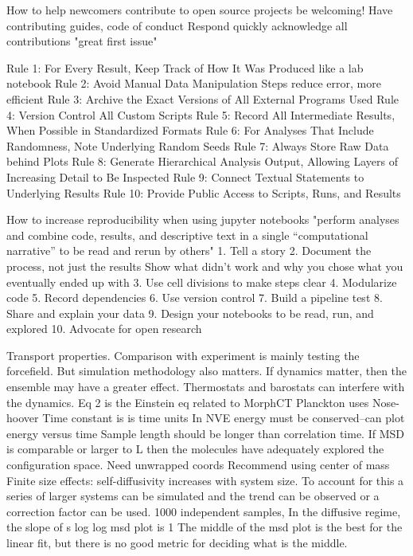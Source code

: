 \cite{Sholler2019}
How to help newcomers contribute to open source projects
be welcoming!
Have contributing guides, code of conduct
Respond quickly
acknowledge all contributions
"great first issue"

\cite{Sandve2013}
Rule 1: For Every Result, Keep Track of How It Was Produced
like a lab notebook
Rule 2: Avoid Manual Data Manipulation Steps
reduce error, more efficient
Rule 3: Archive the Exact Versions of All External Programs Used
Rule 4: Version Control All Custom Scripts
Rule 5: Record All Intermediate Results, When Possible in Standardized Formats
Rule 6: For Analyses That Include Randomness, Note Underlying Random Seeds
Rule 7: Always Store Raw Data behind Plots
Rule 8: Generate Hierarchical Analysis Output, Allowing Layers of Increasing Detail to Be Inspected
Rule 9: Connect Textual Statements to Underlying Results
Rule 10: Provide Public Access to Scripts, Runs, and Results

\cite{Rule2019a}
How to increase reproducibility when using jupyter notebooks
"perform analyses and combine code, results, and descriptive text in a single “computational narrative” to be read and rerun by others"
1. Tell a story
2. Document the process, not just the results
Show what didn't work and why you chose what you eventually ended up with
3. Use cell divisions to make steps clear
4. Modularize code
5. Record dependencies
6. Use version control
7. Build a pipeline
test
8. Share and explain your data
9. Design your notebooks to be read, run, and explored
10. Advocate for open research

\cite{Maginn2018}
Transport properties. Comparison with experiment is mainly testing the forcefield.
But simulation methodology also matters.
If dynamics matter, then the ensemble may have a greater effect.
Thermostats and barostats can interfere with the dynamics.
Eq 2 is the Einstein eq related to MorphCT
Planckton uses Nose-hoover
Time constant is is time units
In NVE energy must be conserved--can plot energy versus time
Sample length should be longer than correlation time.
If MSD is comparable or larger to L then the molecules have adequately explored the configuration space.
Need unwrapped coords
Recommend using center of mass
Finite size effects: self-diffusivity increases with system size. To account for this a series of larger systems can be simulated and the trend can be observed or a correction factor can be used.
1000 independent samples,
In the diffusive regime, the slope of s log log msd plot is 1
The middle of the msd plot is the best for the linear fit, but there is no good metric for deciding what is the middle.

